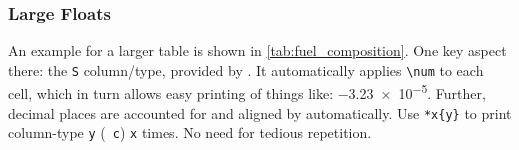 \subsubsection{Large Floats}

An example for a larger table is shown in \cref{tab:fuel_composition}.
One key aspect there: the \verb|S| column\-/type, provided by .
It automatically applies \verb|\num| to each cell, which in turn allows easy
printing of things like: \num{-3.23e-5}.
Further, decimal places are accounted for and aligned by automatically.
Use \verb|*x{y}| to print column-type \verb|y| (\ \verb|c|) \verb|x|
times.
No need for tedious repetition.

\begin{landscape}
        \begin{table}[tbp]
        \caption{Compositions and properties of fuels, as used in }
        \label{tab:fuel_composition}


\end{table}
\end{landscape}
